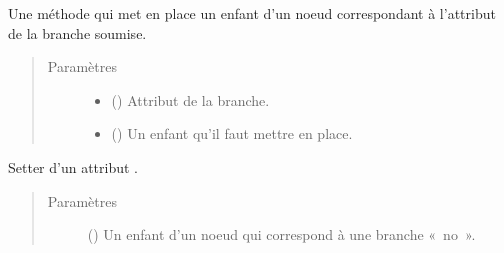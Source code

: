 \documentclass[letterpaper,10pt,french]{sphinxmanual}
\begin{document}
\begin{fulllineitems}
\begin{fulllineitems}
\label{\detokenize{index:StrategyTree.Observation.set_child_by_attribute}}
Une méthode qui met en place un enfant d’un noeud correspondant à l’attribut de la branche soumise.
\begin{quote}\begin{description}
\item[{Paramètres}] \leavevmode\begin{itemize}
\item {} 
 () \textendash{} Attribut de la branche.

\item {} 
 ({\hyperref[\detokenize{index:StrategyTree.NodeST}]{}}\sphinxstyleliteralemphasis{\sphinxupquote{, }}) \textendash{} Un enfant qu’il faut mettre en place.

\end{itemize}

\end{description}\end{quote}

\end{fulllineitems}


\begin{fulllineitems}
\label{\detokenize{index:StrategyTree.Observation.set_no_child}}
Setter d’un attribut .
\begin{quote}\begin{description}
\item[{Paramètres}] \leavevmode
{} ({\hyperref[\detokenize{index:StrategyTree.NodeST}]{}}\sphinxstyleliteralemphasis{\sphinxupquote{, }}) \textendash{} Un enfant d’un noeud qui correspond à une branche « no ».


\end{description}
\end{quote}
\end{fulllineitems}
\end{fulllineitems}
\end{document}
